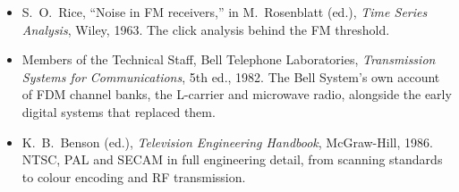 \begin{itemize}
same issue. Two short classics from the IRE's single-sideband special issue.
\item S.~O.~Rice, ``Noise in FM receivers,'' in M.~Rosenblatt (ed.), \emph{Time Series Analysis}, Wiley, 1963. The
click analysis behind the FM threshold.
\item Members of the Technical Staff, Bell Telephone Laboratories, \emph{Transmission Systems for
Communications}, 5th ed., 1982. The Bell System's own account of FDM channel banks, the L-carrier and microwave
radio, alongside the early digital systems that replaced them.
\item K.~B.~Benson (ed.), \emph{Television Engineering Handbook}, McGraw-Hill, 1986. NTSC, PAL and SECAM in full
engineering detail, from scanning standards to colour encoding and RF transmission.
\end{itemize}

